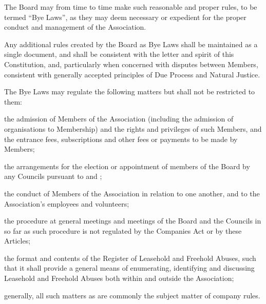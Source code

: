 \documentclass[10pt]{mk-articles-of-association}
\newcommand{\EC}[0]{Board}
\newcommand{\Exec}[0]{\EC{} }
\newcommand{\LAFA}[0]{Leasehold and Freehold Abuses}
\begin{document}
\begin{constenum}

\item The \Exec may from time to time make such reasonable and proper
  rules, to be termed ``Bye Laws'', as they may deem necessary or
  expedient for the proper conduct and management of the Association.

\item Any additional rules created by the \Exec as Bye Laws
  shall be maintained as a single document, and shall be
  consistent with the letter and spirit of this Constitution, and,
  particularly when concerned with disputes between Members,
  consistent with generally accepted principles of Due Process and
  Natural Justice.

\item The Bye Laws may regulate the following matters but shall not be
  restricted to them:

\begin{constenum}

\item the admission of Members of the Association (including the admission
  of organisations to Membership) and the rights and privileges of
  such Members, and the entrance fees, subscriptions and other fees or
  payments to be made by Members;

\item the arrangements for the election or appointment of members of
  the \Exec by any Councils pursuant to
   and ;

\item the conduct of Members of the Association in relation to one
  another, and to the Association's employees and volunteers;

\item the procedure at general meetings and meetings of the \Exec and
  the Councils in so far as such procedure is not regulated by the
  Companies Act or by these Articles;

\item the format and contents of the Register of \LAFA, such that
  it shall provide a general means of enumerating, identifying and
  discussing \LAFA{} both within and outside the Association; \ITand

\item generally, all such matters as are commonly the subject matter
  of company rules.

\end{constenum}


\end{constenum}
\end{document}
